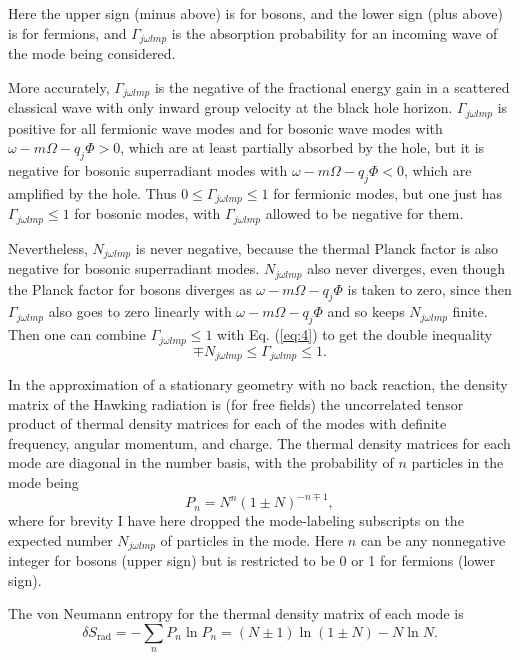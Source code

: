 \documentclass[12pt]{article} \usepackage{latexsym} \textwidth 15cm
\begin{document}
Here the upper sign (minus above) is for bosons, and the lower sign
(plus above) is for fermions, and $\Gamma_{j\omega lmp}$ is the
absorption probability for an incoming wave of the mode being
considered.

More accurately, $\Gamma_{j\omega lmp}$ is the negative of the
fractional energy gain in a scattered classical wave with only inward
group velocity at the black hole horizon.  $\Gamma_{j\omega lmp}$ is
positive for all fermionic wave modes and for bosonic wave modes with
$\omega-m\Omega-q_j\Phi > 0$, which are at least partially absorbed by
the hole, but it is negative for bosonic superradiant modes with
$\omega-m\Omega-q_j\Phi < 0$, which are amplified by the hole.  Thus
$0 \le \Gamma_{j\omega lmp} \le 1$ for fermionic modes, but one just
has $\Gamma_{j\omega lmp} \le 1$ for bosonic modes, with
$\Gamma_{j\omega lmp}$ allowed to be negative for them.

Nevertheless, $N_{j\omega lmp}$ is never negative, because the thermal
Planck factor is also negative for bosonic superradiant modes.
$N_{j\omega lmp}$ also never diverges, even though the Planck factor
for bosons diverges as $\omega-m\Omega-q_j\Phi$ is taken to zero,
since then $\Gamma_{j\omega lmp}$ also goes to zero linearly with
$\omega-m\Omega-q_j\Phi$ and so keeps $N_{j\omega lmp}$ finite.
Then one can combine $\Gamma_{j\omega lmp} \le 1$ with Eq. (\ref{eq:4})
to get the double inequality
 \begin{equation}
 \mp N_{j\omega lmp} \le \Gamma_{j\omega lmp} \le 1.
 \label{eq:4b}
 \end{equation}

In the approximation of a stationary geometry with no back reaction,
the density matrix of the Hawking radiation is (for free fields) the
uncorrelated tensor product of thermal density matrices for each of
the modes with definite frequency, angular momentum, and charge.  The
thermal density matrices for each mode are diagonal in the number
basis, with the probability of $n$ particles in the mode being
 \begin{equation}
 P_n = N^n (1\pm N)^{-n\mp 1},
 \label{eq:5}
 \end{equation}
where for brevity I have here dropped the mode-labeling subscripts on
the expected number $N_{j\omega lmp}$ of particles in the mode.  Here
$n$ can be any nonnegative integer for bosons (upper sign) but is
restricted to be 0 or 1 for fermions (lower sign).

The von Neumann entropy for the thermal density matrix of each mode is
 \begin{equation}
 \delta S_{\mathrm{rad}} = - \sum_n P_n \ln P_n
              = (N \pm 1)\ln{(1 \pm N)} - N\ln{N}.
 \label{eq:5b}
 \end{equation}
\end{document}
